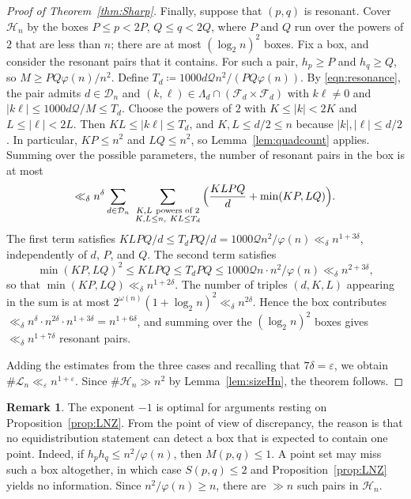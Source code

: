 \documentclass[12pt]{amsart}
\theoremstyle{definition}
\newtheorem{remark}{Remark}
\begin{document}
\begin{proof}[Proof of Theorem~\ref{thm:Sharp}]
Finally, suppose that $(p,q)$ is resonant.  Cover $\mathcal{H}_n$ by the boxes $P\le p<2P$, $Q\le q<2Q$, where $P$ and $Q$ run over the powers of $2$ that are less than $n$; there are at most $(\log_2n)^2$ boxes.  Fix a box, and consider the resonant pairs that it contains.  For such a pair, $h_p\ge P$ and $h_q\ge Q$, so $M\ge PQ\varphi(n)/n^2$.  Define $T_d\coloneq 1000 d \mathcal{Q}n^2/(PQ\varphi(n))$.  By \eqref{eqn:resonance}, the pair admits $d\in\mathcal{D}_n$ and $(k,\ell)\in\Lambda_d\cap(\mathcal{F}_d\times\mathcal{F}_d)$ with $k\ell\ne0$ and $|k\ell|\le1000 d \mathcal{Q}/M\le T_d$.  Choose the powers of $2$ with $K\le|k|<2K$ and $L\le|\ell|<2L$.  Then $KL\le|k\ell|\le T_d$, and $K,L\le d/2\le n$ because $|k|,|\ell|\le d/2$.  In particular, $KP\le n^2$ and $LQ\le n^2$, so Lemma~\ref{lem:quadcount} applies.  Summing over the possible parameters, the number of resonant pairs in the box is at most
\[
\ll_{\delta}n^{\delta}\sum_{d\in\mathcal{D}_n}\ \sum_{\substack{K,L\ \textup{powers of }2\\ K,L\le n,\ KL\le T_d}} \Big(\frac{KLPQ}{d}+\min(KP,LQ)\Big).
\]
The first term satisfies $KLPQ/d\le T_dPQ/d=1000 \mathcal{Q}n^2/\varphi(n)\ll_{\delta}n^{1+3\delta}$, independently of $d$, $P$, and $Q$.  The second term satisfies
\[
\min(KP,LQ)^2\le KLPQ\le T_dPQ \le 1000 \mathcal{Q}n \cdot n^2/\varphi(n)\ll_{\delta}n^{2+3\delta},
\]
so that $\min(KP,LQ)\ll_{\delta}n^{1+2\delta}$.  The number of triples $(d,K,L)$ appearing in the sum is at most $2^{\omega(n)}(1+\log_2n)^2\ll_{\delta}n^{2\delta}$.  Hence the box contributes $\ll_{\delta}n^{\delta}\cdot n^{2\delta}\cdot n^{1+3\delta}=n^{1+6\delta}$, and summing over the $(\log_2n)^2$ boxes gives $\ll_{\delta}n^{1+7\delta}$ resonant pairs.

Adding the estimates from the three cases and recalling that $7\delta=\varepsilon$, we obtain $\#\mathcal{L}_n\ll_{\varepsilon}n^{1+\varepsilon}$.  Since $\#\mathcal{H}_n\gg n^2$ by Lemma~\ref{lem:sizeHn}, the theorem follows.
\end{proof}

\begin{remark}
\label{rem:optimal}
The exponent $-1$ is optimal for arguments resting on Proposition~\ref{prop:LNZ}.  From the point of view of discrepancy, the reason is that no equidistribution statement can detect a box that is expected to contain one point.  Indeed, if $h_ph_q\le n^2/\varphi(n)$, then $M(p,q)\le1$.  A point set may miss such a box altogether, in which case $S(p,q)\le2$ and Proposition~\ref{prop:LNZ} yields no information.  Since $n^2/\varphi(n)\ge n$, there are $\gg n$ such pairs in $\mathcal{H}_n$.
\end{remark}
\end{document}
